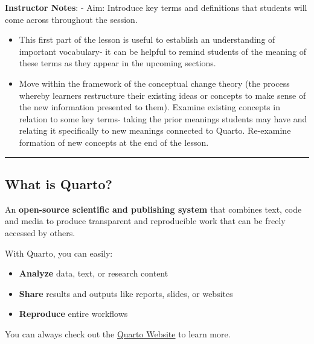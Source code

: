 \documentclass[
  letterpaper,
  DIV=11,
  numbers=noendperiod]{scrartcl}
\providecommand{\tightlist}{%
  \setlength{\itemsep}{0pt}\setlength{\parskip}{0pt}}
\begin{document}
\textbf{Instructor Notes}: - Aim: Introduce key terms and definitions
that students will come across throughout the session.

\begin{itemize}
\item
  This first part of the lesson is useful to establish an understanding
  of important vocabulary- it can be helpful to remind students of the
  meaning of these terms as they appear in the upcoming sections.
\item
  Move within the framework of the conceptual change theory (the process
  whereby learners restructure their existing ideas or concepts to make
  sense of the new information presented to them). Examine existing
  concepts in relation to some key terms- taking the prior meanings
  students may have and relating it specifically to new meanings
  connected to Quarto. Re-examine formation of new concepts at the end
  of the lesson.
\end{itemize}

\begin{center}\rule{0.5\linewidth}{0.5pt}\end{center}

\subsection{What is Quarto?}\label{what-is-quarto}

An \textbf{open-source scientific and publishing system} that combines
text, code and media to produce transparent and reproducible work that
can be freely accessed by others.

With Quarto, you can easily:

\begin{itemize}
\tightlist
\item
  \textbf{Analyze} data, text, or research content
\item
  \textbf{Share} results and outputs like reports, slides, or websites
\item
  \textbf{Reproduce} entire workflows
\end{itemize}

\begin{tcolorbox}[enhanced jigsaw, opacitybacktitle=0.6, toptitle=1mm, colbacktitle=quarto-callout-note-color!10!white, toprule=.15mm, left=2mm, colback=white, colframe=quarto-callout-note-color-frame, opacityback=0, bottomtitle=1mm, breakable, titlerule=0mm, rightrule=.15mm, arc=.35mm, title=\textcolor{quarto-callout-note-color}{\faInfo}\hspace{0.5em}{Quarto Website}, bottomrule=.15mm, coltitle=black, leftrule=.75mm]

You can always check out the \href{https://quarto.org/}{Quarto Website}
to learn more.

\end{tcolorbox}
\end{document}
